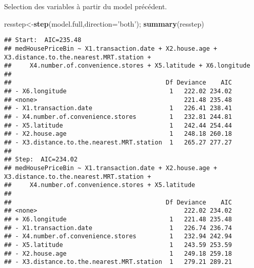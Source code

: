 \documentclass[
]{article}
\newenvironment{Shaded}{\begin{snugshade}}{\end{snugshade}}
\newcommand{\DataTypeTok}[1]{\textcolor[rgb]{0.13,0.29,0.53}{#1}}
\newcommand{\KeywordTok}[1]{\textcolor[rgb]{0.13,0.29,0.53}{\textbf{#1}}}
\newcommand{\NormalTok}[1]{#1}
\newcommand{\StringTok}[1]{\textcolor[rgb]{0.31,0.60,0.02}{#1}}
\begin{document}
Selection des variables à partir du model précédent.

\begin{Shaded}
\begin{Highlighting}[]
\NormalTok{resstep<-}\KeywordTok{step}\NormalTok{(model.full,}\DataTypeTok{direction=}\StringTok{'both'}\NormalTok{); }\KeywordTok{summary}\NormalTok{(resstep)}
\end{Highlighting}
\end{Shaded}

\begin{verbatim}
## Start:  AIC=235.48
## medHousePriceBin ~ X1.transaction.date + X2.house.age + X3.distance.to.the.nearest.MRT.station + 
##     X4.number.of.convenience.stores + X5.latitude + X6.longitude
## 
##                                          Df Deviance    AIC
## - X6.longitude                            1   222.02 234.02
## <none>                                        221.48 235.48
## - X1.transaction.date                     1   226.41 238.41
## - X4.number.of.convenience.stores         1   232.81 244.81
## - X5.latitude                             1   242.44 254.44
## - X2.house.age                            1   248.18 260.18
## - X3.distance.to.the.nearest.MRT.station  1   265.27 277.27
## 
## Step:  AIC=234.02
## medHousePriceBin ~ X1.transaction.date + X2.house.age + X3.distance.to.the.nearest.MRT.station + 
##     X4.number.of.convenience.stores + X5.latitude
## 
##                                          Df Deviance    AIC
## <none>                                        222.02 234.02
## + X6.longitude                            1   221.48 235.48
## - X1.transaction.date                     1   226.74 236.74
## - X4.number.of.convenience.stores         1   232.94 242.94
## - X5.latitude                             1   243.59 253.59
## - X2.house.age                            1   249.18 259.18
## - X3.distance.to.the.nearest.MRT.station  1   279.21 289.21
\end{verbatim}
\end{document}
